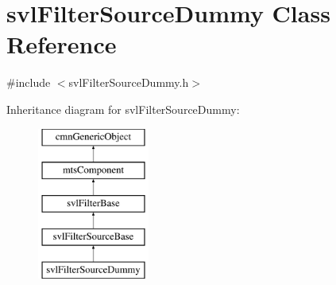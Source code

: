 \hypertarget{classsvl_filter_source_dummy}{\section{svl\-Filter\-Source\-Dummy Class Reference}
\label{classsvl_filter_source_dummy}
}


{\ttfamily \#include $<$svl\-Filter\-Source\-Dummy.\-h$>$}

Inheritance diagram for svl\-Filter\-Source\-Dummy\-:\begin{figure}[H]
\begin{center}
\leavevmode
\includegraphics[height=5.000000cm]{de/d45/classsvl_filter_source_dummy}
\end{center}
\end{figure}
